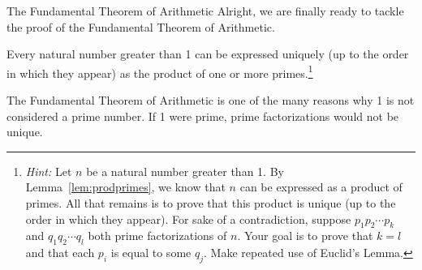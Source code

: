 \begin{section}{The Fundamental Theorem of Arithmetic}
Alright, we are finally ready to tackle the proof of the Fundamental Theorem of Arithmetic.

\begin{theorem}\label{thm:FTA}
Every natural number greater than 1 can be expressed uniquely (up to the order in which they appear) as the product of one or more primes.\footnote{\emph{Hint:} Let $n$ be a natural number greater than 1. By Lemma~\ref{lem:prodprimes}, we know that $n$ can be expressed as a product of primes.  All that remains is to prove that this product is unique (up to the order in which they appear). For sake of a contradiction, suppose $p_1 p_2 \cdots p_k$ and $q_1 q_2 \cdots q_l$ both prime factorizations of $n$.  Your goal is to prove that $k=l$ and that each $p_i$ is equal to some $q_j$. Make repeated use of Euclid's Lemma.}
\end{theorem}

The Fundamental Theorem of Arithmetic is one of the many reasons why 1 is not considered a prime number. If 1 were prime, prime factorizations would not be unique.

\end{section}